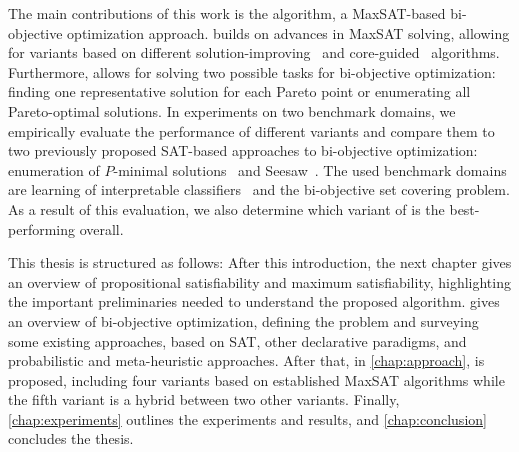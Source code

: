 The main contributions of this work is the \algname{} algorithm, a MaxSAT-based bi-objective optimization approach.
\algname{} builds on advances in MaxSAT solving, allowing for variants based on different solution-improving~\autocite{handbook2-maxsat,DBLP:journals/jsat/BerreP10,DBLP:journals/jsat/EenS06} and core-guided~\autocite{DBLP:journals/corr/abs-0712-1097,DBLP:conf/sat/AnsoteguiBL09,DBLP:conf/cp/MorgadoDM14,DBLP:journals/jsat/IgnatievMM19} algorithms.
Furthermore, \algname{} allows for solving two possible tasks for bi-objective optimization: finding one representative solution for each Pareto point or enumerating all Pareto-optimal solutions.
In experiments on two benchmark domains, we empirically evaluate the performance of different \algname{} variants and compare them to two previously proposed SAT-based approaches to bi-objective optimization: enumeration of $P$-minimal solutions~\autocite{DBLP:conf/cp/SohBTB17} and Seesaw~\autocite{DBLP:conf/cp/JanotaMSM21}.
The used benchmark domains are learning of interpretable classifiers~\autocite{DBLP:conf/cp/MaliotovM18} and the bi-objective set covering problem.
As a result of this evaluation, we also determine which variant of \algname{} is the best-performing overall.

This thesis is structured as follows:
After this introduction, the next chapter gives an overview of propositional satisfiability and maximum satisfiability, highlighting the important preliminaries needed to understand the proposed algorithm.
 gives an overview of bi-objective optimization, defining the problem and surveying some existing approaches, based on SAT, other declarative paradigms, and probabilistic and meta-heuristic approaches.
After that, in \cref{chap:approach}, \algname{} is proposed, including four variants based on established MaxSAT algorithms while the fifth variant is a hybrid between two other variants.
Finally, \cref{chap:experiments} outlines the experiments and results, and \cref{chap:conclusion} concludes the thesis.
